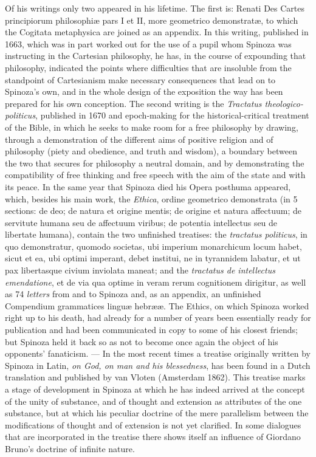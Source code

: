 Of his writings only two appeared in his lifetime. The first is: Renati
Des Cartes principiorum philosophiæ pars I et II, more geometrico
demonstratæ, to which the Cogitata metaphysica are joined as an
appendix. In this writing, published in 1663, which was in part worked
out for the use of a pupil whom Spinoza was instructing in the Cartesian
philosophy, he has, in the course of expounding that philosophy,
indicated the points where difficulties that are insoluble from the
standpoint of Cartesianism make necessary consequences that lead on to
Spinoza's own, and in the whole design of the exposition the way has
been prepared for his own conception. The second writing is the
\emph{Tractatus theologico-politicus}, published in 1670 and
epoch-making for the historical-critical treatment of the Bible, in
which he seeks to make room for a free philosophy by drawing, through a
demonstration of the different aims of positive religion and of
philosophy (piety and obedience, and truth and wisdom), a boundary
between the two that secures for philosophy a neutral domain, and by
demonstrating the compatibility of free thinking and free speech with
the aim of the state and with its peace. In the same year that Spinoza
died his Opera posthuma appeared, which, besides his main
work, the \emph{Ethica}, ordine geometrico demonstrata (in 5 sections:
de deo; de natura et origine mentis; de origine et natura affectuum; de
servitute humana seu de affectuum viribus; de potentia intellectus seu
de libertate humana), contain the two unfinished treatises: the
\emph{tractatus politicus}, in quo demonstratur, quomodo societas, ubi
imperium monarchicum locum habet, sicut et ea, ubi optimi imperant,
debet institui, ne in tyrannidem labatur, et ut pax libertasque civium
inviolata maneat; and the \emph{tractatus de intellectus emendatione},
et de via qua optime in veram rerum cognitionem dirigitur, as well as 74
\emph{letters} from and to Spinoza and, as an appendix, an unfinished
Compendium grammatices linguæ hebrææ. The Ethics, on which Spinoza
worked right up to his death, had already for a number of years been
essentially ready for publication and had been communicated in copy to
some of his closest friends; but Spinoza held it back so as not to
become once again the object of his opponents' fanaticism. --- In the
most recent times a treatise originally written by Spinoza in Latin,
\emph{on God, on man and his blessedness}, has been found in a Dutch
translation and published by van Vloten (Amsterdam 1862). This treatise
marks a stage of development in Spinoza at which he has indeed arrived
at the concept of the unity of substance, and of thought and extension
as attributes of the one substance, but at which his peculiar doctrine
of the mere parallelism between the modifications of thought and of
extension is not yet clarified. In some dialogues that are incorporated
in the treatise there shows itself an influence of Giordano Bruno's
doctrine of infinite nature.

